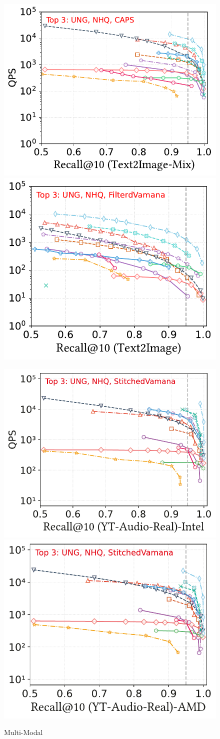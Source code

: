 \documentclass[sigconf, nonacm]{acmart}
\begin{document}
{\begin{figure}
	\begin{minipage}[t]{0.38\textwidth}
		\centering
		\includegraphics[width=0.495\linewidth]{figures/exp/attribute_multimodel.pdf}
		\hfill 
		\includegraphics[width=0.47\linewidth]{figures/exp/attribute_multimodel_1.pdf}
		\caption{Multi-Modal}
		\label{fig:attribute-multimodal} 
	\end{minipage}%
	\hfill %
	\begin{minipage}[t]{0.39\textwidth}
		\centering
		\includegraphics[width=0.495\linewidth]{figures/exp/attribute_85.pdf}
		\hfill
		\includegraphics[width=0.47\linewidth]{figures/exp/attribute_71.pdf}

\end{minipage}
\end{figure}}
\end{document}

